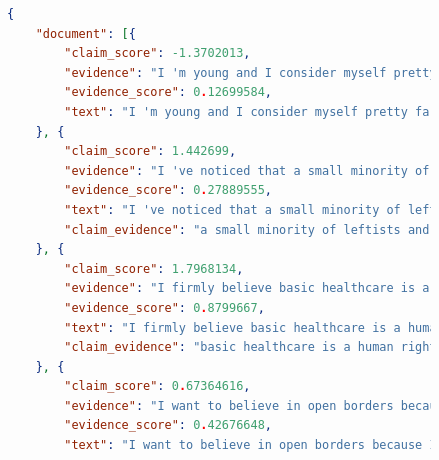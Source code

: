 \documentclass[12pt,a4paper]{article}
\begin{document}
\begin{figure}[H]
    \centering
    \begin{lstlisting}[language=json,firstnumber=1]
    {
	"document": [{
		"claim_score": -1.3702013,
		"evidence": "I 'm young and I consider myself pretty far left ( my values align pretty closely with Warren , Sanders , AOC ) .",
		"evidence_score": 0.12699584,
		"text": "I 'm young and I consider myself pretty far left ( my values align pretty closely with Warren , Sanders , AOC ) ."
	}, {
		"claim_score": 1.442699,
		"evidence": "I 've noticed that a small minority of leftists and democratic socialists advocate for open borders while also arguing that universal healthcare should be a priority in the Democratic Party .",
		"evidence_score": 0.27889555,
		"text": "I 've noticed that a small minority of leftists and democratic socialists advocate for open borders while also arguing that universal healthcare should be a priority in the Democratic Party .",
		"claim_evidence": "a small minority of leftists and democratic socialists advocate for open bordersuniversal healthcare should be a priority in the Democratic Party"
	}, {
		"claim_score": 1.7968134,
		"evidence": "I firmly believe basic healthcare is a human right that should be provided by the government to all people regardless of immigration status .",
		"evidence_score": 0.8799667,
		"text": "I firmly believe basic healthcare is a human right that should be provided by the government to all people regardless of immigration status .",
		"claim_evidence": "basic healthcare is a human right that should be provided by the government to all people regardless of immigration status"
	}, {
		"claim_score": 0.67364616,
		"evidence": "I want to believe in open borders because I see how borders have turned entire countries and regions into war zones ( not only in the American southwest but in India/Pakistan , Israel/Palestine , etc ) ... However , I ca n't help but feel that if we had both universal healthcare and open borders , we would create a ` drain ' in which people could come over from other countries , obtain free healthcare , and leave without making enough of a contribution to the American economy to sustain the system .",
		"evidence_score": 0.42676648,
		"text": "I want to believe in open borders because I see how borders have turned entire countries and regions into war zones ( not only in the American southwest but in India/Pakistan , Israel/Palestine , etc ) ... However , I ca n't help but feel that if we had both universal healthcare and open borders , we would create a ` drain ' in which people could come over from other countries , obtain free healthcare , and leave without making enough of a contribution to the American economy to sustain the system .",

\end{lstlisting}
\end{figure}
\end{document}
